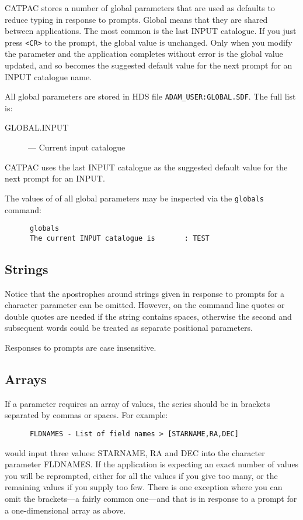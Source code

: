 {\small CATPAC} stores a number of global parameters that are used as defaults
to reduce typing in response to prompts. Global means that they are shared
between applications.  The most common is the last INPUT catalogue. If you just
press {\tt <CR>} to the prompt, the global value is unchanged. Only when you
modify the parameter and the  application completes without error is the global
value updated, and so becomes the suggested default value for the next prompt
for an INPUT catalogue name.

All global parameters are stored in HDS file {\tt ADAM\_USER:GLOBAL.SDF}.
The full list is:

\begin{description}
\begin{description}
\item [GLOBAL.INPUT] --- Current input catalogue
\end{description}
\end{description}

{\small CATPAC} uses the last INPUT catalogue as the
suggested default value for the next prompt for an INPUT. 

The values of of all global parameters may be inspected via the
{\tt globals} command:
\begin{verbatim}
      globals
      The current INPUT catalogue is       : TEST
\end{verbatim}

\subsection{Strings}
\label{se:parstring}
Notice that the apostrophes around strings given in response to prompts
for a character parameter can be omitted. However, on the command
line quotes or double quotes are needed if the string contains spaces,
otherwise the second and subsequent words could be treated as
separate positional parameters.

Responses to prompts are case insensitive. 

\subsection{Arrays}
If a parameter requires an array of values, the series
should be in brackets separated by commas or spaces.  For example:
\begin{verbatim}
      FLDNAMES - List of field names > [STARNAME,RA,DEC]
\end{verbatim}
would input three values: STARNAME, RA and DEC into the character parameter
FLDNAMES.  If the application is expecting an exact number of values
you will be reprompted, either for all the values if you give too many,
or the remaining values if you supply too few.  There is one exception
where you can omit the brackets---a fairly common one---and that is in
response to a prompt for a one-dimensional array as above.

